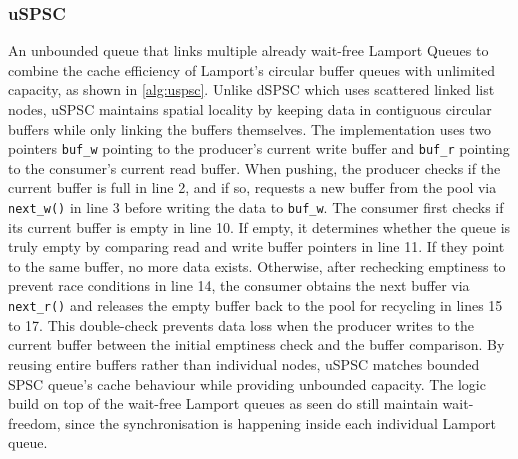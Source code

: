 \subsubsection{\acf{uSPSC}}
An unbounded queue that links multiple already wait-free Lamport Queues to combine the cache efficiency of Lamport's circular buffer queues with unlimited capacity, as shown in \cref{alg:uspsc}. Unlike \ac{dSPSC} which uses scattered linked list nodes, uSPSC maintains spatial locality by keeping data in contiguous circular buffers while only linking the buffers themselves. The implementation uses two pointers \texttt{buf\_w} pointing to the producer's current write buffer and \texttt{buf\_r} pointing to the consumer's current read buffer. When pushing, the producer checks if the current buffer is full in line 2, and if so, requests a new buffer from the pool via \texttt{next\_w()} in line 3 before writing the data to \texttt{buf\_w}. The consumer first checks if its current buffer is empty in line 10. If empty, it determines whether the queue is truly empty by comparing read and write buffer pointers in line 11. If they point to the same buffer, no more data exists. Otherwise, after rechecking emptiness to prevent race conditions in line 14, the consumer obtains the next buffer via \texttt{next\_r()} and releases the empty buffer back to the pool for recycling in lines 15 to 17. This double-check prevents data loss when the producer writes to the current buffer between the initial emptiness check and the buffer comparison. By reusing entire buffers rather than individual nodes, \ac{uSPSC} matches bounded \ac{SPSC} queue's cache behaviour while providing unbounded capacity. The logic build on top of the wait-free Lamport queues as seen do still maintain wait-freedom, since the synchronisation is happening inside each individual Lamport queue. \cite{torquati2010singleproducersingleconsumerqueuessharedcache}

